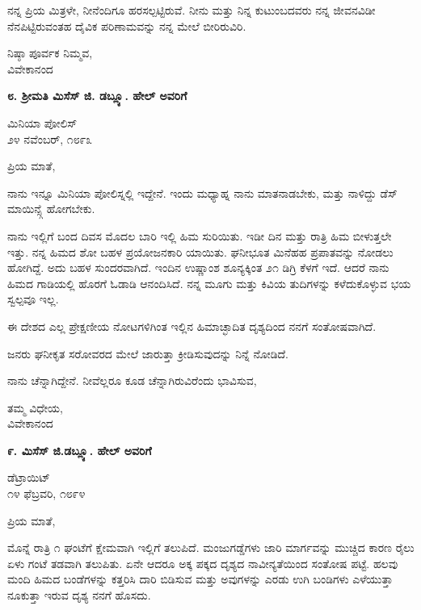 ನನ್ನ ಪ್ರಿಯ ಮಿತ್ರಳೇ, ನೀನೆಂದಿಗೂ ಹರಸಲ್ಪಟ್ಟಿರುವೆ. ನೀನು ಮತ್ತು ನಿನ್ನ ಕುಟುಂಬದವರು ನನ್ನ ಜೀವನವಿಡೀ ನೆನಪಿಟ್ಟಿರುವಂತಹ ದೈವಿಕ ಪರಿಣಾಮವನ್ನು ನನ್ನ ಮೇಲೆ ಬೀರಿರುವಿರಿ.

\begin{flushright}
ನಿಷ್ಠಾ ಪೂರ್ವಕ ನಿಮ್ಮವ,\\ವಿವೇಕಾನಂದ
\end{flushright}

\begin{center}
\textbf{೮. ಶ‍್ರೀಮತಿ ಮಿಸೆಸ್ ಜಿ. ಡಬ್ಲ್ಯೂ. ಹೇಲ್ ಅವರಿಗೆ}
\end{center}

\begin{flushright}
ಮಿನಿಯಾ ಪೋಲಿಸ್\\೨೪ ನವೆಂಬರ್, ೧೮೯೩
\end{flushright}

ಪ್ರಿಯ ಮಾತೆ,

ನಾನು ಇನ್ನೂ ಮಿನಿಯಾ ಪೋಲಿಸ್ನಲ್ಲಿ ಇದ್ದೇನೆ. ಇಂದು ಮಧ್ಯಾಹ್ನ ನಾನು ಮಾತನಾಡಬೇಕು, ಮತ್ತು ನಾಳಿದ್ದು ಡೆಸ್ ಮಾಯಿನ್ಸ್ಗೆ ಹೋಗಬೇಕು.

ನಾನು ಇಲ್ಲಿಗೆ ಬಂದ ದಿವಸ ಮೊದಲ ಬಾರಿ ಇಲ್ಲಿ ಹಿಮ ಸುರಿಯಿತು. ಇಡೀ ದಿನ ಮತ್ತು ರಾತ್ರಿ ಹಿಮ ಬೀಳುತ್ತಲೇ ಇತ್ತು. ನನ್ನ ಹಿಮದ ಶೋ ಬಹಳ ಪ್ರಯೋಜನಕಾರಿ ಯಾಯಿತು. ಘನೀಭೂತ ಮಿನೆಹಹ ಪ್ರಪಾತವನ್ನು ನೋಡಲು ಹೋಗಿದ್ದೆ. ಅದು ಬಹಳ ಸುಂದರವಾಗಿದೆ. ಇಂದಿನ ಉಷ್ಣಾಂಶ ಶೂನ್ಯಕ್ಕಿಂತ ೨೧ ಡಿಗ್ರಿ ಕೆಳಗೆ ಇದೆ. ಆದರೆ ನಾನು ಹಿಮದ ಗಾಡಿಯಲ್ಲಿ ಹೊರಗೆ ಓಡಾಡಿ ಆನಂದಿಸಿದೆ. ನನ್ನ ಮೂಗು ಮತ್ತು ಕಿವಿಯ ತುದಿಗಳನ್ನು ಕಳೆದುಕೊಳ್ಳುವ ಭಯ ಸ್ವಲ್ಪವೂ ಇಲ್ಲ.

ಈ ದೇಶದ ಎಲ್ಲ ಪ್ರೇಕ್ಷಣೀಯ ನೋಟಗಳಿಗಿಂತ ಇಲ್ಲಿನ ಹಿಮಾಚ್ಛಾದಿತ ದೃಶ್ಯದಿಂದ ನನಗೆ ಸಂತೋಷವಾಗಿದೆ.

ಜನರು ಘನೀಕೃತ ಸರೋವರದ ಮೇಲೆ ಜಾರುತ್ತಾ ಕ್ರೀಡಿಸುವುದನ್ನು ನಿನ್ನೆ ನೋಡಿದೆ.

ನಾನು ಚೆನ್ನಾಗಿದ್ದೇನೆ. ನೀವೆಲ್ಲರೂ ಕೂಡ ಚೆನ್ನಾಗಿರುವಿರೆಂದು ಭಾವಿಸುವ,

\begin{flushright}
ತಮ್ಮ ವಿಧೇಯ,\\ವಿವೇಕಾನಂದ
\end{flushright}

\begin{center}
\textbf{೯. ಮಿಸೆಸ್ ಜಿ.ಡಬ್ಲ್ಯೂ. ಹೇಲ್ ಅವರಿಗೆ}
\end{center}

\begin{flushright}
ಡೆಟ್ರಾಯಿಟ್\\೧೪ ಫೆಬ್ರವರಿ, ೧೮೯೪
\end{flushright}

ಪ್ರಿಯ ಮಾತೆ,

ಮೊನ್ನೆ ರಾತ್ರಿ ೧ ಘಂಟೆಗೆ ಕ್ಷೇಮವಾಗಿ ಇಲ್ಲಿಗೆ ತಲುಪಿದೆ. ಮಂಜುಗಡ್ಡೆಗಳು ಜಾರಿ ಮಾರ್ಗವನ್ನು ಮುಚ್ಚಿದ ಕಾರಣ ರೈಲು ಏಳು ಗಂಟೆ ತಡವಾಗಿ ತಲುಪಿತು. ಏನೇ ಆದರೂ ಅಕ್ಕ ಪಕ್ಕದ ದೃಶ್ಯದ ನಾವೀನ್ಯತೆಯಿಂದ ಸಂತೋಷ ಪಟ್ಟೆ. ಹಲವು ಮಂದಿ ಹಿಮದ ಬಂಡೆಗಳನ್ನು ಕತ್ತರಿಸಿ ದಾರಿ ಬಿಡಿಸುವ ಮತ್ತು ಅವುಗಳನ್ನು ಎರಡು ಉಗಿ ಬಂಡಿಗಳು ಎಳೆಯುತ್ತಾ ನೂಕುತ್ತಾ ಇರುವ ದೃಶ್ಯ ನನಗೆ ಹೊಸದು.

